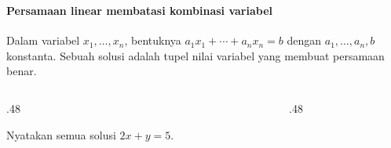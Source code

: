 \documentclass{../../kalkulus-ppt}
\begin{document}
\begin{frame}
    \frametitle{\insertsection}
    \framesubtitle{Persamaan linear membatasi kombinasi variabel}
    \begin{definisi}
        Dalam variabel $x_1,\ldots,x_n$, bentuknya $a_1x_1+\cdots+a_nx_n=b$ dengan $a_1,\ldots,a_n,b$ konstanta.
        Sebuah solusi adalah tupel nilai variabel yang membuat persamaan benar.
    \end{definisi}
    \begin{columns}[c,onlytextwidth]
        \begin{column}{.48\textwidth}
            \begin{contoh}
                Nyatakan semua solusi $2x+y=5$.
            \end{contoh}
        \end{column}
        \begin{column}{.48\textwidth}
        \end{column}
    \end{columns}
\end{frame}
\end{document}
